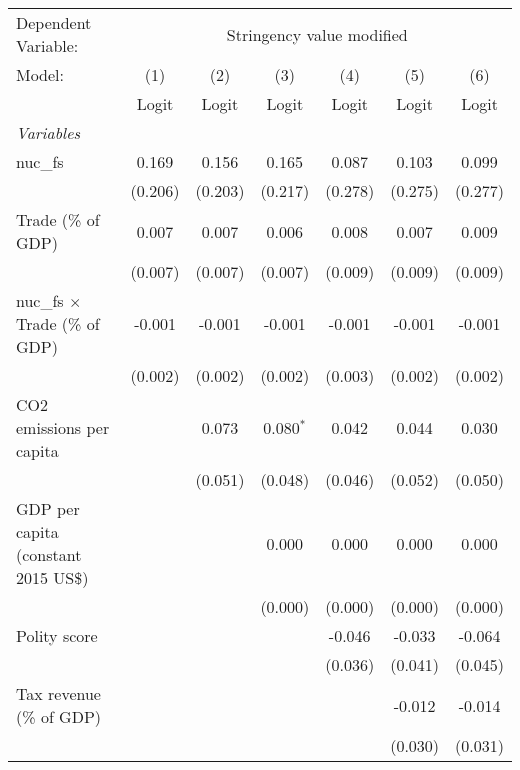 
\begingroup
\centering
\begin{tabular}{lcccccc}
   \toprule
   Dependent Variable: & \multicolumn{6}{c}{Stringency value modified}\\
   Model:                                & (1)     & (2)     & (3)         & (4)     & (5)     & (6)\\  
                                         &  Logit  & Logit   & Logit       & Logit   & Logit   & Logit\\  
   \midrule
   \emph{Variables}\\
   nuc\_fs                               & 0.169   & 0.156   & 0.165       & 0.087   & 0.103   & 0.099\\   
                                         & (0.206) & (0.203) & (0.217)     & (0.278) & (0.275) & (0.277)\\   
   Trade (\% of GDP)                     & 0.007   & 0.007   & 0.006       & 0.008   & 0.007   & 0.009\\   
                                         & (0.007) & (0.007) & (0.007)     & (0.009) & (0.009) & (0.009)\\   
   nuc\_fs $\times$ Trade (\% of GDP)    & -0.001  & -0.001  & -0.001      & -0.001  & -0.001  & -0.001\\   
                                         & (0.002) & (0.002) & (0.002)     & (0.003) & (0.002) & (0.002)\\   
   CO2 emissions per capita              &         & 0.073   & 0.080$^{*}$ & 0.042   & 0.044   & 0.030\\   
                                         &         & (0.051) & (0.048)     & (0.046) & (0.052) & (0.050)\\   
   GDP per capita (constant 2015 US\$)   &         &         & 0.000       & 0.000   & 0.000   & 0.000\\   
                                         &         &         & (0.000)     & (0.000) & (0.000) & (0.000)\\   
   Polity score                          &         &         &             & -0.046  & -0.033  & -0.064\\   
                                         &         &         &             & (0.036) & (0.041) & (0.045)\\   
   Tax revenue (\% of GDP)               &         &         &             &         & -0.012  & -0.014\\   
                                         &         &         &             &         & (0.030) & (0.031)\\   

\end{tabular}
